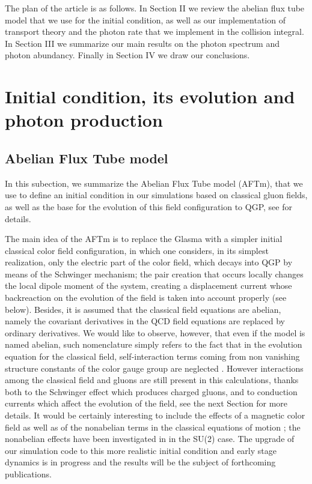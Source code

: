\documentclass[aps,prc,a4paper,nofootinbib,
preprintnumbers,superscriptaddress,twocolumn,showpacs,showkeys]{revtex4}
\begin{document}
The plan of the article is as follows. In Section II we review the abelian flux tube model
that we use for the initial condition, as well as our implementation of transport theory
and the photon rate that we implement in the collision integral.
In Section III we summarize our main results on the photon spectrum and photon abundancy.
Finally in Section IV we draw our conclusions.




\section{Initial condition, its evolution and photon production}


\subsection{Abelian Flux Tube model}
In this subection, we summarize the Abelian Flux Tube model (AFTm),
that we use to define an initial condition in our simulations based on classical gluon fields, 
as well as the base for the evolution of this field configuration to QGP, see  
\cite{Casher:1978wy,Glendenning:1983qq,Bialas:1984wv,Bialas:1984ap,Bialas:1985is,
Gyulassy:1986jq,Gatoff:1987uf,Elze:1986qd,Elze:1986hq,Bialas:1986mt,
Florkowski:2003mm,Bajan:2001fs,Bialas:1989hc,Dyrek:1988eb,
Bialas:1987en,Ryblewski:2013eja,Florkowski:2014ska,Florkowski:2010zz,
Ruggieri:2015yea,Ruggieri:2016ckn} for details.

The main idea of the AFTm is to replace the Glasma with a simpler initial classical color field configuration,
in which one considers, in its simplest realization, only the electric part of the color field, which decays
into QGP by means of the Schwinger mechanism; the pair creation that occurs locally changes the local dipole
moment of the system, creating a displacement current whose backreaction on the evolution of the field
is taken into account properly (see below). 
Besides, it is assumed that the classical field equations are abelian, namely the covariant derivatives
in the QCD field equations are replaced by ordinary  derivatives. 
We would like to observe, however, that even if the model is named abelian, such nomenclature
simply refers to the fact that in the evolution equation for the classical field, self-interaction terms
coming from non vanishing structure constants of the color gauge group are neglected \cite{Florkowski:2010zz}. 
However interactions among the classical field and gluons are still present in this calculations,
thanks both to the Schwinger effect which produces charged gluons, and to conduction currents which
affect the evolution of the field, see the next Section for more details. 
It would be certainly interesting to include the effects of a magnetic color field
as well as of the nonabelian terms in the classical equations of motion%
; the nonabelian effects have been investigated in \cite{Voronyuk:2015ita} in the SU(2) case.
The upgrade of our simulation code to this more realistic initial condition and
early stage dynamics is in progress and the results will be the subject of
forthcoming publications. 
\end{document}

